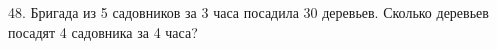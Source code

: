 48. Бригада из 5 садовников за 3 часа посадила 30 деревьев. Сколько деревьев посадят 4 садовника за 4 часа?\\
